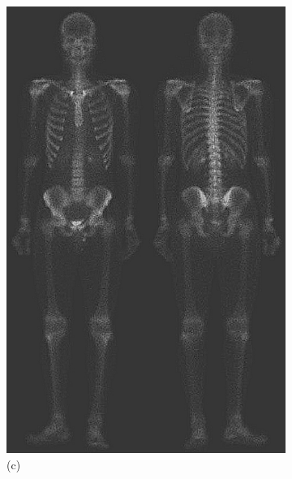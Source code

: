\begin{figure}[h!]
\begin{subfigure}[b]{0.4\linewidth}
		\includegraphics[width=\linewidth]{myfigure/p2/2-c.png}
		\caption*{(c)}
		\label{fig:2c}
	\end{subfigure}
	\begin{subfigure}[b]{0.4\linewidth}

\end{subfigure}
\end{figure}
